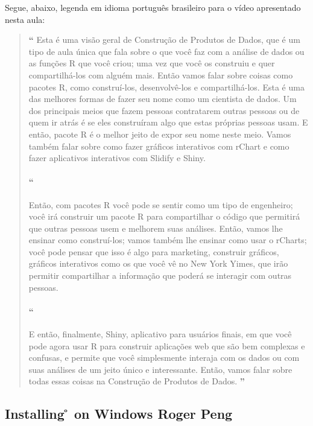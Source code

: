 Segue, abaixo, legenda em idioma português brasileiro para o vídeo apresentado nesta aula:

\begin{quotation}%
\begin{small}
{\large\textbf{``}}%
Esta é uma visão geral de Construção de Produtos de Dados, que é um tipo de aula única que fala sobre o que você faz com a análise de dados ou as funções R que você criou; uma vez que você os construiu e quer compartilhá-los com alguém mais. Então vamos falar sobre coisas como pacotes R, como construí-los, desenvolvê-los e compartilhá-los. Esta é uma das melhores formas de fazer seu nome como um cientista de dados. Um dos principais meios que fazem pessoas contratarem outras pessoas ou de quem ir atrás é se eles construíram algo que estas próprias pessoas usam. E então, pacote R é o melhor jeito de expor seu nome neste meio. Vamos também falar sobre como fazer gráficos interativos com rChart e como fazer aplicativos interativos com Slidify e Shiny. 

\paragraph{``}
Então, com pacotes R você pode se sentir como um tipo de engenheiro; você irá construir um pacote R para compartilhar o código que permitirá que outras pessoas usem e melhorem suas análises. Então, vamos lhe ensinar como construí-los; vamos também lhe ensinar como usar o rCharts; você pode pensar que isso é algo para marketing, construir gráficos, gráficos interativos como os que você vê no New York Yimes, que irão permitir compartilhar a informação que poderá se interagir com outras pessoas. 

\paragraph{``}
E então, finalmente, Shiny, aplicativo para usuários finais, em que você pode agora usar R para construir aplicações web que são bem complexas e confusas, e permite que você simplesmente interaja com os dados ou com suas análises de um jeito único e interessante. Então, vamos falar sobre todas essas coisas na Construção de Produtos de Dados.
{\large\textbf{''}}
\end{small}
\end{quotation}


\subsection{Installing \r{} on Windows {Roger Peng}}

